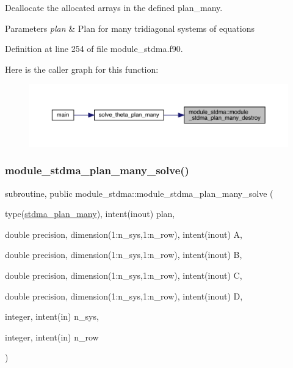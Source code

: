 Deallocate the allocated arrays in the defined plan\+\_\+many. 


\begin{DoxyParams}{Parameters}
{\em plan} & Plan for many tridiagonal systems of equations \\
\hline
\end{DoxyParams}


Definition at line 254 of file module\+\_\+stdma.\+f90.

Here is the caller graph for this function\+:\nopagebreak
\begin{figure}[H]
\begin{center}
\leavevmode
\includegraphics[width=350pt]{namespacemodule__stdma_a4ff32ed335c7df121dbb0be635a29287_icgraph}
\end{center}
\end{figure}
\mbox{\label{namespacemodule__stdma_aa0817e49b29e14abc90f0aab91c4c2d9}} 
\subsubsection{\texorpdfstring{module\_stdma\_plan\_many\_solve()}{module\_stdma\_plan\_many\_solve()}}
{\footnotesize\ttfamily subroutine, public module\+\_\+stdma\+::module\+\_\+stdma\+\_\+plan\+\_\+many\+\_\+solve (\begin{DoxyParamCaption}\item[{type(\mbox{\hyperlink{structmodule__stdma_1_1stdma__plan__many}{stdma\+\_\+plan\+\_\+many}}), intent(inout)}]{plan,  }\item[{double precision, dimension(1\+:n\+\_\+sys,1\+:n\+\_\+row), intent(inout)}]{A,  }\item[{double precision, dimension(1\+:n\+\_\+sys,1\+:n\+\_\+row), intent(inout)}]{B,  }\item[{double precision, dimension(1\+:n\+\_\+sys,1\+:n\+\_\+row), intent(inout)}]{C,  }\item[{double precision, dimension(1\+:n\+\_\+sys,1\+:n\+\_\+row), intent(inout)}]{D,  }\item[{integer, intent(in)}]{n\+\_\+sys,  }\item[{integer, intent(in)}]{n\+\_\+row }\end{DoxyParamCaption})}



